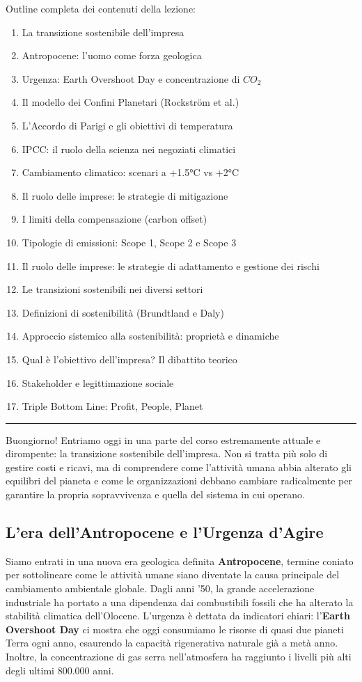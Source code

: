 \documentclass[a4paper,10pt]{article}
\begin{document}
Outline completa dei contenuti della lezione:
{\small
\begin{enumerate}
\item La transizione sostenibile dell’impresa
\item Antropocene: l'uomo come forza geologica
\item Urgenza: Earth Overshoot Day e concentrazione di $CO_2$
\item Il modello dei Confini Planetari (Rockström et al.)
\item L'Accordo di Parigi e gli obiettivi di temperatura
\item IPCC: il ruolo della scienza nei negoziati climatici
\item Cambiamento climatico: scenari a +1.5°C vs +2°C
\item Il ruolo delle imprese: le strategie di mitigazione
\item I limiti della compensazione (carbon offset)
\item Tipologie di emissioni: Scope 1, Scope 2 e Scope 3
\item Il ruolo delle imprese: le strategie di adattamento e gestione dei rischi
\item Le transizioni sostenibili nei diversi settori
\item Definizioni di sostenibilità (Brundtland e Daly)
\item Approccio sistemico alla sostenibilità: proprietà e dinamiche
\item Qual è l’obiettivo dell’impresa? Il dibattito teorico
\item Stakeholder e legittimazione sociale
\item Triple Bottom Line: Profit, People, Planet
\end{enumerate}
}
\hrule
\vspace{0.5cm}

Buongiorno! Entriamo oggi in una parte del corso estremamente attuale e dirompente: la transizione sostenibile dell'impresa. Non si tratta più solo di gestire costi e ricavi, ma di comprendere come l'attività umana abbia alterato gli equilibri del pianeta e come le organizzazioni debbano cambiare radicalmente per garantire la propria sopravvivenza e quella del sistema in cui operano.

\subsection*{L'era dell'Antropocene e l'Urgenza d'Agire}

Siamo entrati in una nuova era geologica definita \textbf{Antropocene}, termine coniato per sottolineare come le attività umane siano diventate la causa principale del cambiamento ambientale globale. Dagli anni '50, la grande accelerazione industriale ha portato a una dipendenza dai combustibili fossili che ha alterato la stabilità climatica dell'Olocene. L'urgenza è dettata da indicatori chiari: l'\textbf{Earth Overshoot Day} ci mostra che oggi consumiamo le risorse di quasi due pianeti Terra ogni anno, esaurendo la capacità rigenerativa naturale già a metà anno. Inoltre, la concentrazione di gas serra nell'atmosfera ha raggiunto i livelli più alti degli ultimi 800.000 anni.
\end{document}

